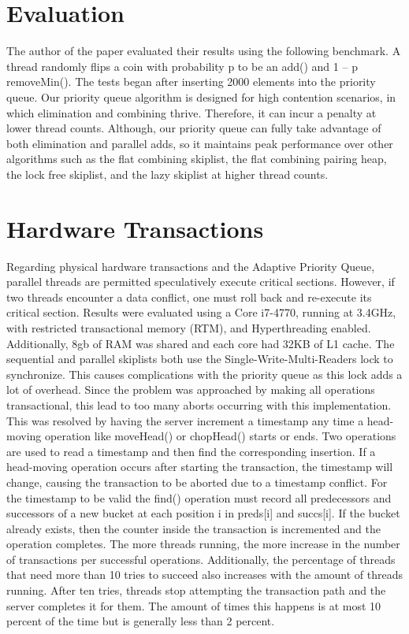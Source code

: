 \documentclass[10pt]{asme2ej}
\begin{document}
\section{Evaluation}

The author of the paper evaluated their results using the following benchmark. A thread randomly flips a coin with probability p to be an add() and 1 – p removeMin(). The tests began after inserting 2000 elements into the priority queue. Our priority queue algorithm is designed for high contention scenarios, in which elimination and combining thrive. Therefore, it can incur a penalty at lower thread counts. Although, our priority queue can fully take advantage of both elimination and parallel adds, so it maintains peak performance over other algorithms such as the flat combining skiplist, the flat combining pairing heap, the lock free skiplist, and the lazy skiplist at higher thread counts.

\section{Hardware Transactions}

Regarding physical hardware transactions and the Adaptive Priority Queue, parallel threads are permitted speculatively execute critical sections. However, if two threads encounter a data conflict, one must roll back and re-execute its critical section. Results were evaluated using a Core i7-4770, running at 3.4GHz, with restricted transactional memory (RTM), and Hyperthreading enabled. Additionally, 8gb of RAM was shared and each core had 32KB of L1 cache\cite{latex}. 
\linebreak
\linebreak
\indent The sequential and parallel skiplists both use the Single-Write-Multi-Readers lock to synchronize. This causes complications with the priority queue as this lock adds a lot of overhead. Since the problem was approached by making all operations transactional, this lead to too many aborts occurring with this implementation. This was resolved by having the server increment a timestamp any time a head-moving operation like moveHead() or chopHead() starts or ends. Two operations are used to read a timestamp and then find the corresponding insertion. If a head-moving operation occurs after starting the transaction, the timestamp will change, causing the transaction to be aborted due to a timestamp conflict. For the timestamp to be valid the find() operation must record all predecessors and successors of a new bucket at each position i in preds[i] and succs[i]. If the bucket already exists, then the counter inside the transaction is incremented and the operation completes. The more threads running, the more increase in the number of transactions per successful operations. Additionally, the percentage of threads that need more than 10 tries to succeed also increases with the amount of threads running. After ten tries, threads stop attempting the transaction path and the server completes it for them. The amount of times this happens is at most 10 percent of the time but is generally less than 2 percent.
\end{document}

